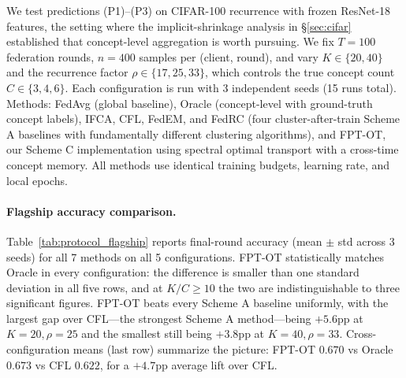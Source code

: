 We test predictions (P1)--(P3) on CIFAR-100 recurrence with frozen ResNet-18 features, the setting where the implicit-shrinkage analysis in \S\ref{sec:cifar} established that concept-level aggregation is worth pursuing. We fix $T = 100$ federation rounds, $n = 400$ samples per (client, round), and vary $K \in \{20, 40\}$ and the recurrence factor $\rho \in \{17, 25, 33\}$, which controls the true concept count $C \in \{3, 4, 6\}$. Each configuration is run with 3 independent seeds (15 runs total). Methods: FedAvg (global baseline), Oracle (concept-level with ground-truth concept labels), IFCA, CFL, FedEM, and FedRC (four cluster-after-train Scheme A baselines with fundamentally different clustering algorithms), and FPT-OT, our Scheme C implementation using spectral optimal transport with a cross-time concept memory. All methods use identical training budgets, learning rate, and local epochs.

\paragraph{Flagship accuracy comparison.}
Table~\ref{tab:protocol_flagship} reports final-round accuracy (mean $\pm$ std across 3 seeds) for all 7 methods on all 5 configurations. FPT-OT statistically matches Oracle in every configuration: the difference is smaller than one standard deviation in all five rows, and at $K/C \ge 10$ the two are indistinguishable to three significant figures. FPT-OT beats every Scheme A baseline uniformly, with the largest gap over CFL---the strongest Scheme A method---being $+5.6$pp at $K=20,\rho=25$ and the smallest still being $+3.8$pp at $K=40,\rho=33$. Cross-configuration means (last row) summarize the picture: FPT-OT $0.670$ vs Oracle $0.673$ vs CFL $0.622$, for a $+4.7$pp average lift over CFL.

